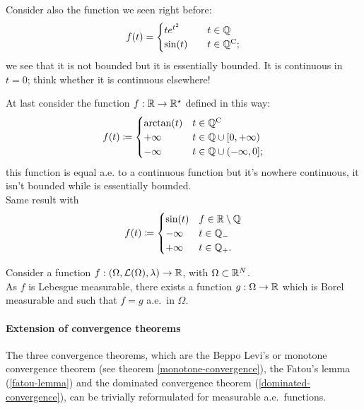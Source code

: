 \begin{exam}
	Consider also the function we seen right before: 
	$$ 
		f(t) = \begin{cases}
		t e^{t^2} 
		\quad & t \in \mathbb Q \\
		\sin(t) \quad & t \in \mathbb Q^{\mathrm{C}}
		;
		\end{cases}
	$$
	we see that it is not bounded but it is essentially bounded. It is continuous in $t=0$; think whether it is continuous elsewhere!
\end{exam}

\begin{exam}
	At last consider the function $f: \mathbb R \to \mathbb R^\star$ defined in this way:
	$$
		f(t) 
		\coloneqq \begin{cases}
			\arctan(t) & t \in \mathbb Q^{\mathrm{C}}\\
			+\infty & t \in \mathbb Q \cup [0,+\infty)\\
			-\infty & t \in \mathbb Q \cup (-\infty,0]
			;
		\end{cases}
	$$
	this function is equal a.e. to a continuous function but it's nowhere continuous, it isn't bounded while is essentially bounded.\\
	Same result with 
	$$
		f(t) 
		\coloneqq \begin{cases} 
			\sin(t) & f \in \mathbb R \setminus \mathbb Q \\
			-\infty & t \in \mathbb Q_- \\ 
			+\infty & t \in \mathbb Q_+
			.
		\end{cases}
	$$
\end{exam}

\begin{prop}
	Consider a function $f: (\Omega, \mathcal L(\Omega),\lambda) \to \mathbb R$, with $\Omega \subset \mathbb R^N$.\\
	As $f$ is Lebesgue measurable, there exists a function $g:\Omega\to \mathbb R$ which is Borel measurable and such that $f = g$ a.e.\ in $\Omega$.
\end{prop}

\paragraph{Extension of convergence theorems} The three convergence theorems, which are the Beppo Levi's or monotone convergence theorem (see theorem \vref{monotone-convergence}), the Fatou's lemma (\vref{fatou-lemma}) and the dominated convergence theorem (\vref{dominated-convergence}), can be trivially reformulated for measurable a.e.\ functions.

